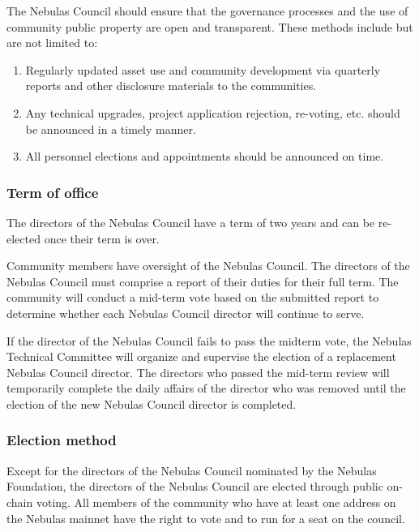 The Nebulas Council should ensure that the governance processes and the use of community public property are open and transparent. These methods include but are not limited to:

\begin{enumerate}
	\item Regularly updated asset use and community development via quarterly reports and other disclosure materials to the communities.
	\item Any technical upgrades, project application rejection, re-voting, etc. should be announced in a timely manner.
	\item All personnel elections and appointments should be announced on time.
\end{enumerate}

\subsubsection{Term of office}

The directors of the Nebulas Council have a term of two years and can be re-elected once their term is over.

\vspace{2em}


Community members have oversight of the Nebulas Council. The directors of the Nebulas Council must comprise a report of their duties for their full term. The community will conduct a mid-term vote based on the submitted report to determine whether each Nebulas Council director will continue to serve.

If the director of the Nebulas Council fails to pass the midterm vote, the Nebulas Technical Committee will organize and supervise the election of a replacement Nebulas Council director. The directors who passed the mid-term review will temporarily complete the daily affairs of the director who was removed until the election of the new Nebulas Council director is completed.

\subsubsection{Election method}

Except for the directors of the Nebulas Council nominated by the Nebulas Foundation, the directors of the Nebulas Council are elected through public on-chain voting. All members of the community who have at least one address on the Nebulas mainnet have the right to vote and to run for a seat on the council.

